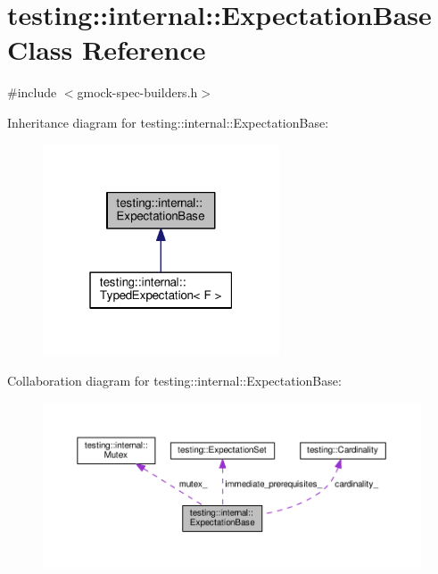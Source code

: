 \hypertarget{classtesting_1_1internal_1_1ExpectationBase}{}\section{testing\+:\+:internal\+:\+:Expectation\+Base Class Reference}
\label{classtesting_1_1internal_1_1ExpectationBase}


{\ttfamily \#include $<$gmock-\/spec-\/builders.\+h$>$}



Inheritance diagram for testing\+:\+:internal\+:\+:Expectation\+Base\+:
\nopagebreak
\begin{figure}[H]
\begin{center}
\leavevmode
\includegraphics[width=199pt]{classtesting_1_1internal_1_1ExpectationBase__inherit__graph}
\end{center}
\end{figure}


Collaboration diagram for testing\+:\+:internal\+:\+:Expectation\+Base\+:
\nopagebreak
\begin{figure}[H]
\begin{center}
\leavevmode
\includegraphics[width=350pt]{classtesting_1_1internal_1_1ExpectationBase__coll__graph}
\end{center}
\end{figure}

